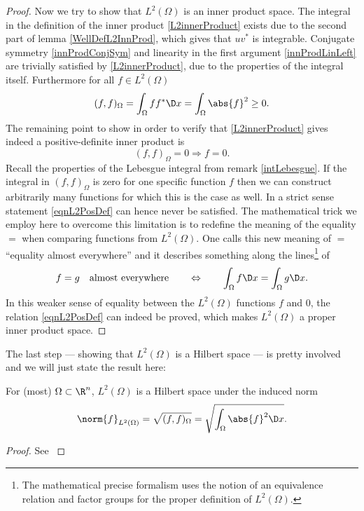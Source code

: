 \begin{proof}
	\noindent
	Now we try to show that $L^2(\Omega)$ is an inner product space. 
	The integral in the definition of the inner product \eqref{L2innerProduct} exists due to the second part of lemma \ref{WellDefL2InnProd}, which gives that $u v^\ast$ is integrable.
	Conjugate symmetry \eqref{innProdConjSym} and linearity in the first argument \eqref{innProdLinLeft} are trivially satisfied by \eqref{L2innerProduct}, due to the properties of the integral itself.
	Furthermore for all $f \in L^2(\Omega)$
	\[(f,f)_\Omega = \int_\Omega f f^\ast \D x = \int_\Omega \abs{f}^2 \ge 0.\]
	The remaining point to show in order to verify that \eqref{L2innerProduct} gives indeed a positive-definite inner product is
	\begin{equation}
		(f,f)_\Omega = 0 \Rightarrow f = 0.
		\label{eqnL2PosDef}
	\end{equation}
	Recall the properties of the Lebesgue integral from remark \ref{intLebesgue}. 
	If the integral in $(f,f)_\Omega$ is zero for one specific function $f$ then we can construct arbitrarily many functions for which this is the case as well.
	In a strict sense statement \eqref{eqnL2PosDef} can hence never be satisfied. 
	The mathematical trick we employ here to overcome this limitation is to redefine the meaning of the equality $=$ when comparing functions from $L^2(\Omega)$.
	One calls this new meaning of $=$ ``equality almost everywhere'' and it describes something along the lines\footnote{The mathematical precise formalism uses the notion of an equivalence relation and factor groups for the proper definition of $L^2(\Omega)$.} of
	\[ f = g \quad \text{almost everywhere} \qquad \Leftrightarrow \qquad \int_\Omega f \D x = \int_\Omega g \D x .\]
	In this weaker sense of equality between the $L^2(\Omega)$ functions $f$ and $0$, the relation \eqref{eqnL2PosDef} can indeed be proved, which makes $L^2(\Omega)$ a proper inner product space.
\end{proof}

\noindent
The last step --- showing that $L^2(\Omega)$ is a Hilbert space --- is pretty involved and we will just state the result here:
\begin{thm}
	\label{l2hilbert}
	For (most) $\Omega \subset \R^n$, $L^2(\Omega)$ is a Hilbert space under the induced norm
	\begin{equation}
		\norm{f}_{L^2(\Omega)} = \sqrt{(f,f)_\Omega} = \sqrt{\int_\Omega \abs{f}^2 \D x} .
		\label{L2norm}
	\end{equation}
\end{thm}
\begin{proof}
	See \cite{Adams2003}
\end{proof}

